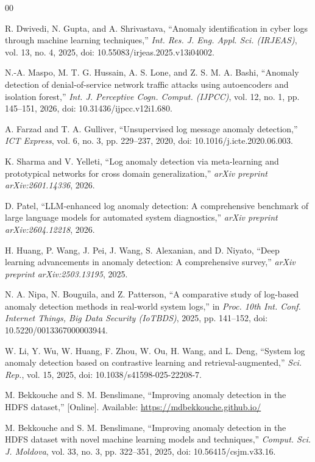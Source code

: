 \documentclass[10pt,conference]{IEEEtran}
\begin{document}
\begin{thebibliography}{00}
\fontsize{9pt}{11pt}\selectfont
\setlength{\itemsep}{2pt plus 0.5pt minus 0.5pt}

 R. Dwivedi, N. Gupta, and A. Shrivastava, ``Anomaly identification in cyber logs through machine learning techniques,'' \emph{Int. Res. J. Eng. Appl. Sci. (IRJEAS)}, vol. 13, no. 4, 2025, doi: 10.55083/irjeas.2025.v13i04002.

 N.-A. Maspo, M. T. G. Hussain, A. S. Lone, and Z. S. M. A. Bashi, ``Anomaly detection of denial-of-service network traffic attacks using autoencoders and isolation forest,'' \emph{Int. J. Perceptive Cogn. Comput. (IJPCC)}, vol. 12, no. 1, pp. 145--151, 2026, doi: 10.31436/ijpcc.v12i1.680.

 A. Farzad and T. A. Gulliver, ``Unsupervised log message anomaly detection,'' \emph{ICT Express}, vol. 6, no. 3, pp. 229--237, 2020, doi: 10.1016/j.icte.2020.06.003.

 K. Sharma and V. Yelleti, ``Log anomaly detection via meta-learning and prototypical networks for cross domain generalization,'' \emph{arXiv preprint arXiv:2601.14336}, 2026.

 D. Patel, ``LLM-enhanced log anomaly detection: A comprehensive benchmark of large language models for automated system diagnostics,'' \emph{arXiv preprint arXiv:2604.12218}, 2026.

 H. Huang, P. Wang, J. Pei, J. Wang, S. Alexanian, and D. Niyato, ``Deep learning advancements in anomaly detection: A comprehensive survey,'' \emph{arXiv preprint arXiv:2503.13195}, 2025.

 N. A. Nipa, N. Bouguila, and Z. Patterson, ``A comparative study of log-based anomaly detection methods in real-world system logs,'' in \emph{Proc. 10th Int. Conf. Internet Things, Big Data Security (IoTBDS)}, 2025, pp. 141--152, doi: 10.5220/0013367000003944.

 W. Li, Y. Wu, W. Huang, F. Zhou, W. Ou, H. Wang, and L. Deng, ``System log anomaly detection based on contrastive learning and retrieval-augmented,'' \emph{Sci. Rep.}, vol. 15, 2025, doi: 10.1038/s41598-025-22208-7.

 M. Bekkouche and S. M. Benslimane, ``Improving anomaly detection in the HDFS dataset,'' [Online]. Available: \url{https://mdbekkouche.github.io/}

 M. Bekkouche and S. M. Benslimane, ``Improving anomaly detection in the HDFS dataset with novel machine learning models and techniques,'' \emph{Comput. Sci. J. Moldova}, vol. 33, no. 3, pp. 322--351, 2025, doi: 10.56415/csjm.v33.16.


\end{thebibliography}
\end{document}
